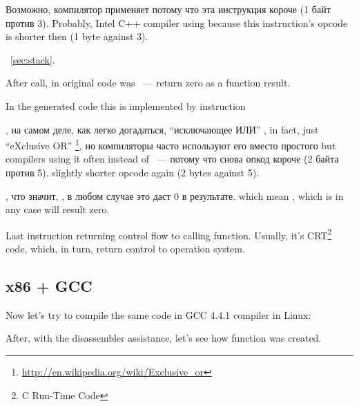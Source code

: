 \IFRU
{Возможно, компилятор применяет  потому что эта инструкция короче (1 байт против 3).}
{Probably, Intel C++ compiler using  because this instruction's opcode is shorter then 
 (1 byte against 3).}

~\ref{sec:stack}.

{After \printf call, in original \CCpp code was  ~--- return zero as a \main function result.} 

{In the generated code this is implemented by instruction}  

\IFRU
{\XOR, на самом деле, как легко догадаться, ``исключающее ИЛИ''}
{\XOR, in fact, just ``eXclusive OR''}
\footnote{\url{http://en.wikipedia.org/wiki/Exclusive_or}}, 
\IFRU
{но компиляторы часто используют его вместо простого}
{but compilers using it often instead of}
 ~--- 
\IFRU
{потому что снова опкод короче (2 байта против 5).}
{slightly shorter opcode again (2 bytes against 5).}

, 
\IFRU
{что значит, , в любом случае это даст 0 в результате.}
{which mean , which is in any case will result zero.}

{Last instruction \RET returning control flow to calling function.
Usually, it's \CCpp CRT\footnote{C Run-Time Code} code, which, in turn, 
return control to operation system.}

\subsection{x86 + GCC}

{Now let's try to compile the same \CCpp code in GCC 4.4.1 compiler in Linux}: 

{After, with the \IDA disassembler assistance, let's see how \main function was created.} 

